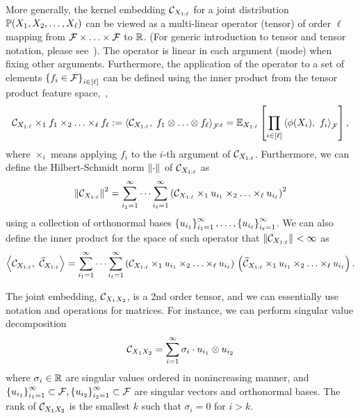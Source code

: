 \documentclass[11pt]{article}
\begin{document}
More generally, the kernel embedding $\mathcal{C}_{X_{1:\ell}}$ for a joint distribution $\mathbb{P}(X_1,X_2,\ldots,X_{\ell})$ can be viewed as a multi-linear operator (tensor) of order $\ell$ mapping from $\mathcal{F}\times\ldots\times \mathcal{F}$ to $\mathbb{R}$. (For generic introduction to tensor and tensor notation, please see~\cite{KolBad09}). The operator is linear in each argument (mode) when fixing other arguments. Furthermore, the application of the operator to a set of elements $\left\{f_i \in \mathcal{F}\right\}_{i \in [\ell]}$ can be defined using the inner product from the tensor product feature space,~\ie,
\begin{align}
	\mathcal{C}_{X_{1:\ell}} \times_1 f_1 \times_2 \ldots \times_\ell f_\ell := 	\left\langle \mathcal{C}_{X_{1:\ell}},\;f_1\otimes\ldots\otimes f_\ell \right\rangle_{\mathcal{F}^d}=\mathbb{E}_{X_{1:\ell}}\left[\prod_{i \in [\ell]} \left\langle \phi(X_i),~f_i \right\rangle_{\mathcal{F}}\right],
\end{align}
where $\times_i$ means applying $f_i$ to the $i$-th argument of $\mathcal{C}_{X_{1:\ell}}$. Furthermore, we can define the Hilbert-Schmidt norm $\left\|\cdot\right\|_{}$ of $\mathcal{C}_{X_{1:\ell}}$ as
\[
 \left\|\mathcal{C}_{X_{1:\ell}}\right\|_{}^2 = \sum_{i_1 = 1}^\infty \cdots \sum_{i_\ell = 1}^\infty \left(\mathcal{C}_{X_{1:\ell}} \times_1 u_{i_1} \times_2 \ldots \times_\ell u_{i_\ell}\right)^2
\]
using a collection of orthonormal bases $\left\{u_{i_1}\right\}_{i_1=1}^\infty, \ldots, \left\{u_{i_\ell}\right\}_{i_\ell=1}^\infty$. We can also define the inner product for the space of such operator that $\left\|\mathcal{C}_{X_{1:\ell}}\right\|_{}<\infty$ as
\begin{align}
	\left\langle \mathcal{C}_{X_{1:\ell}},~\widetilde{\mathcal{C}}_{X_{1:\ell}} \right\rangle_{}  =  \sum_{i_1 = 1}^\infty \cdots \sum_{i_\ell = 1}^\infty \left(\mathcal{C}_{X_{1:\ell}} \times_1 u_{i_1} \times_2 \ldots \times_\ell u_{i_\ell}\right)\, \left(\widetilde{\mathcal{C}}_{X_{1:\ell}} \times_1 u_{i_1} \times_2 \ldots \times_\ell u_{i_\ell}\right).
\end{align}


The joint embedding, $\mathcal{C}_{X_1 X_2}$, is a 2nd order tensor, and we can essentially use notation and operations for matrices. For instance, we can perform singular value decomposition
\[
    \mathcal{C}_{X_1X_2} = \sum_{i=1}^{\infty} \sigma_i \cdot u_{i_1} \otimes u_{i_2}
\]
where $\sigma_i \in \mathbb{R}$ are singular values ordered in nonincreasing manner, and $\left\{u_{i_1}\right\}_{i_1=1}^{\infty} \subset \mathcal{F}, \left\{u_{i_2}\right\}_{i_2=1}^{\infty} \subset \mathcal{F}$ are singular vectors and orthonormal bases. The rank of $\mathcal{C}_{X_1X_2}$ is the smallest $k$ such that $\sigma_i = 0$ for $i > k$.
\end{document}

